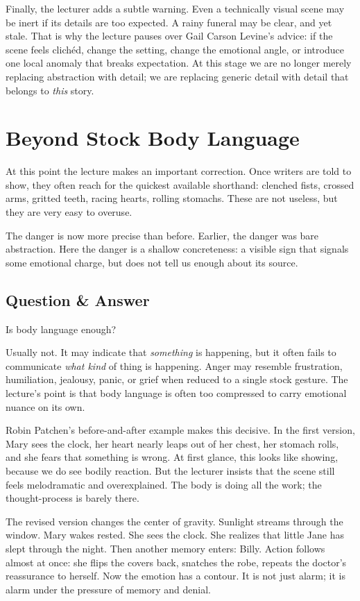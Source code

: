 Finally, the lecturer adds a subtle warning. Even a technically visual scene may be inert if its details are too expected. A rainy funeral may be clear, and yet stale. That is why the lecture pauses over Gail Carson Levine's advice: if the scene feels clich\'ed, change the setting, change the emotional angle, or introduce one local anomaly that breaks expectation. At this stage we are no longer merely replacing abstraction with detail; we are replacing generic detail with detail that belongs to \emph{this} story.

\section{Beyond Stock Body Language}

At this point the lecture makes an important correction. Once writers are told to show, they often reach for the quickest available shorthand: clenched fists, crossed arms, gritted teeth, racing hearts, rolling stomachs. These are not useless, but they are very easy to overuse.

The danger is now more precise than before. Earlier, the danger was bare abstraction. Here the danger is a shallow concreteness: a visible sign that signals some emotional charge, but does not tell us enough about its source.

\subsection{Question \& Answer}

Is body language enough?

Usually not. It may indicate that \emph{something} is happening, but it often fails to communicate \emph{what kind} of thing is happening. Anger may resemble frustration, humiliation, jealousy, panic, or grief when reduced to a single stock gesture. The lecture's point is that body language is often too compressed to carry emotional nuance on its own.

Robin Patchen's before-and-after example makes this decisive. In the first version, Mary sees the clock, her heart nearly leaps out of her chest, her stomach rolls, and she fears that something is wrong. At first glance, this looks like showing, because we do see bodily reaction. But the lecturer insists that the scene still feels melodramatic and overexplained. The body is doing all the work; the thought-process is barely there.

The revised version changes the center of gravity. Sunlight streams through the window. Mary wakes rested. She sees the clock. She realizes that little Jane has slept through the night. Then another memory enters: Billy. Action follows almost at once: she flips the covers back, snatches the robe, repeats the doctor's reassurance to herself. Now the emotion has a contour. It is not just alarm; it is alarm under the pressure of memory and denial.

